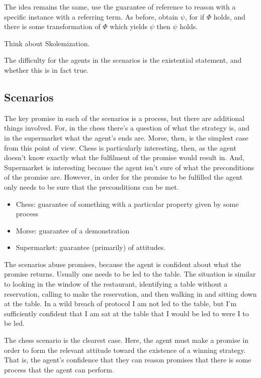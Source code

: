 \documentclass[10pt]{article}
\begin{document}
The idea remains the same, use the guarantee of reference to reason with a specific instance with a referring term.
As before, obtain \(\psi\), for if \(\Phi\) holds, and there is some transformation of \(\Phi\) which yields \(\psi\) then \(\psi\) holds.
\begin{note}
  Think about Skolemization.
\end{note}

The difficulty for the agents in the scenarios is the existential statement, and whether this is in fact true.

\subsection{Scenarios}
\label{sec:scenarios-1}

The key promise in each of the scenarios is a process, but there are additional things involved.
For, in the chess there's a question of what the strategy is, and in the supermarket what the agent's ends are.
Morse, then, is the simplest case from this point of view.
Chess is particularly interesting, then, as the agent doesn't know exactly what the fulfilment of the promise would result in.
And, Supermarket is interesting because the agent isn't sure of what the preconditions of the promise are.
However, in order for the promise to be fulfilled the agent only needs to be sure that the preconditions can be met.

\begin{itemize}
\item Chess: guarantee of something with a particular property given by some process
\item Morse: guarantee of a demonstration
\item Supermarket: guarantee (primarily) of attitudes.
\end{itemize}



The scenarios abuse promises, because the agent is confident about what the promise returns.
Usually one needs to be led to the table.
The situation is similar to looking in the window of the restaurant, identifying a table without a reservation, calling to make the reservation, and then walking in and sitting down at the table.
In a wild breach of protocol I am not led to the table, but I'm sufficiently confident that I am sat at the table that I would be led to were I to be led.


The chess scenario is the clearest case.
Here, the agent must make a promise in order to form the relevant attitude toward the existence of a winning strategy.
That is, the agent's confidence that they can reason promises that there is some process that the agent can perform.
\end{document}
